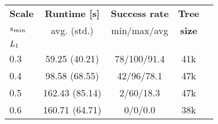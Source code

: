 \begin{tabular}{lcccc}
\toprule
{\bf Scale} & {\bf Runtime [s] } & {\bf Success rate} & {\bf Tree}\\ 
{$s_{min}$ }  & avg. (std.)       & min/max/avg & {\bf size } \\ 
\midrule
\multicolumn{2}{l}{$ L_1 $} \\ 
0.3 & 59.25 (40.21) & 78/100/91.4 & 41k  \\
0.4 & 98.58 (68.55) & 42/96/78.1 & 47k  \\
0.5 & 162.43 (85.14) & 2/60/18.3 & 47k  \\
0.6 & 160.71 (64.71) & 0/0/0.0 & 38k  \\
\bottomrule
\end{tabular}
